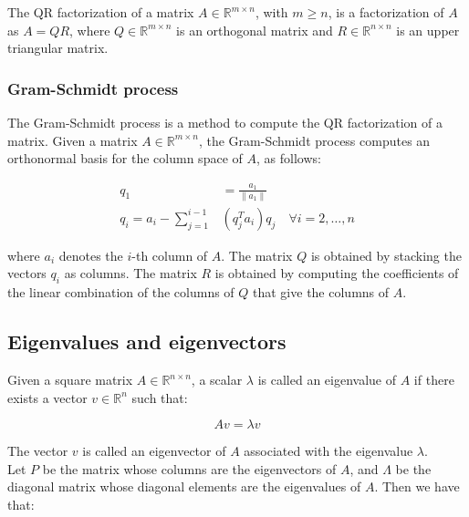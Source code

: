 The QR factorization of a matrix $A \in \mathbb{R}^{m \times n}$, with $m \geq n$, is a factorization of $A$ as $A = QR$, where
$Q \in \mathbb{R}^{m \times n}$ is an orthogonal matrix and $R \in \mathbb{R}^{n \times n}$ is an upper triangular matrix.\\

\subsubsection{Gram-Schmidt process}

The Gram-Schmidt process is a method to compute the QR factorization of a matrix. Given a matrix $A \in \mathbb{R}^{m \times n}$,
the Gram-Schmidt process computes an orthonormal basis for the column space of $A$, as follows:

\begin{equation}
    \begin{aligned}
        q_1 &= \frac{a_1}{\|a_1\|} \\
        q_i = a_i - \sum_{j=1}^{i-1} &(q_j^T a_i) q_j \quad \forall i = 2, \ldots, n
    \end{aligned}
\end{equation}

where $a_i$ denotes the $i$-th column of $A$. The matrix $Q$ is obtained by stacking the vectors $q_i$ as columns. The matrix $R$
is obtained by computing the coefficients of the linear combination of the columns of $Q$ that give the columns of $A$.\\

\subsection{Eigenvalues and eigenvectors}

Given a square matrix $A \in \mathbb{R}^{n \times n}$, a scalar $\lambda$ is called an eigenvalue of $A$ if there exists a vector
$v \in \mathbb{R}^n$ such that:

\begin{equation}
    Av = \lambda v
\end{equation}

The vector $v$ is called an eigenvector of $A$ associated with the eigenvalue $\lambda$.\\

Let $P$ be the matrix whose columns are the eigenvectors of $A$, and $\Lambda$ be the diagonal matrix whose diagonal elements
are the eigenvalues of $A$. Then we have that:

